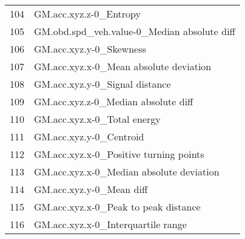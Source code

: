 \begin{tabular}{ll}
104 &                            GM.acc.xyz.z-0\_Entropy \\
105 &       GM.obd.spd\_veh.value-0\_Median absolute diff \\
106 &                           GM.acc.xyz.y-0\_Skewness \\
107 &            GM.acc.xyz.x-0\_Mean absolute deviation \\
108 &                    GM.acc.xyz.y-0\_Signal distance \\
109 &               GM.acc.xyz.z-0\_Median absolute diff \\
110 &                       GM.acc.xyz.x-0\_Total energy \\
111 &                           GM.acc.xyz.y-0\_Centroid \\
112 &            GM.acc.xyz.x-0\_Positive turning points \\
113 &          GM.acc.xyz.x-0\_Median absolute deviation \\
114 &                          GM.acc.xyz.y-0\_Mean diff \\
115 &              GM.acc.xyz.x-0\_Peak to peak distance \\
116 &                GM.acc.xyz.x-0\_Interquartile range \\
\bottomrule
\end{tabular}

